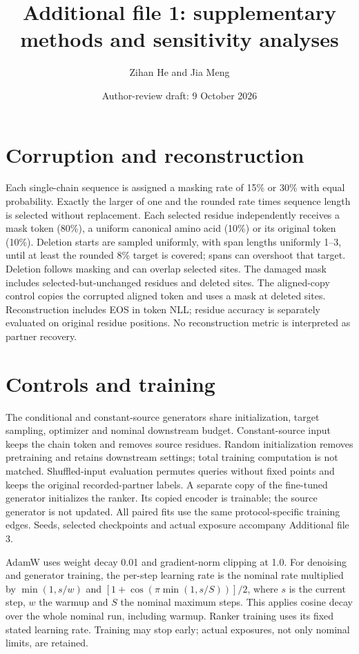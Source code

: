 \documentclass[11pt]{article}
\title{Additional file 1: supplementary methods and sensitivity analyses}
\author{Zihan He and Jia Meng}
\date{Author-review draft: 9 October 2026}
\begin{document}
\maketitle
\section{Corruption and reconstruction}
Each single-chain sequence is assigned a masking rate of 15\% or 30\% with equal
probability. Exactly the larger of one and the rounded rate times sequence
length is selected without replacement. Each selected residue independently
receives a mask token (80\%), a uniform canonical amino acid (10\%) or its
original token (10\%). Deletion starts are sampled uniformly, with span lengths
uniformly 1--3, until at least the rounded 8\% target is covered; spans can
overshoot that target. Deletion follows masking and can overlap selected sites.
The damaged mask includes selected-but-unchanged residues and deleted sites.
The aligned-copy control copies the corrupted aligned token and uses a mask at
deleted sites. Reconstruction includes EOS in token NLL; residue accuracy is
separately evaluated on original residue positions. No reconstruction metric
is interpreted as partner recovery.

\section{Controls and training}
The conditional and constant-source generators share initialization, target
sampling, optimizer and nominal downstream budget. Constant-source input keeps
the chain token and removes source residues. Random initialization removes
pretraining and retains downstream settings; total training computation is not
matched. Shuffled-input evaluation permutes queries without fixed points and
keeps the original recorded-partner labels. A separate copy of the fine-tuned
generator initializes the ranker. Its copied encoder is trainable; the source
generator is not updated. All paired fits use the same protocol-specific
training edges. Seeds, selected checkpoints and actual exposure accompany
Additional file 3.

AdamW uses weight decay 0.01 and gradient-norm clipping at 1.0. For denoising and
generator training, the per-step learning rate is the nominal rate multiplied
by $\min(1,s/w)$ and $[1+\cos(\pi\min(1,s/S))]/2$, where $s$ is the current
step, $w$ the warmup and $S$ the nominal maximum steps. This applies cosine
decay over the whole nominal run, including warmup. Ranker training uses its
fixed stated learning rate. Training may stop early; actual exposures, not only
nominal limits, are retained.
\end{document}
